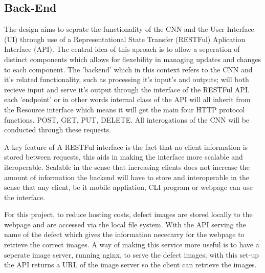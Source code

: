     \subsection{Back-End}
      The design aims to seprate the functionality of the CNN and the User Interface (UI) through use of a Representational State Transfer (RESTFul) Aplication Interface (API). The central idea of this aproach is to allow a seperation of distinct components which allows for flexebility in managing updates and changes to each component. The 'backend' which in this context refers to the CNN and it's related functionality, such as processing it's input's and outputs; will both recieve input and serve it's output through the interface of the RESTFul API. each 'endpoint' or in other words internal class of the API will all inherit from the Resource interface which means it will get the main four HTTP protocol functions. POST, GET, PUT, DELETE. All interogations of the CNN will be conducted through these requests.
      \par
      A key feature of A RESTFul interface is the fact that no client information is stored
      between requests, this aids in making the interface more scalable and iteroperable. Scalable in the sense that increasing clients does not increase the amount of information the backend will have to store and interoperable in the sense that any client, be it mobile appliation, CLI program or webpage can use the interface.
      \par
      For this project, to reduce hosting costs, defect images are stored locally to the webpage and are accessed via the local file system. With the API serving the name of the defect which gives the information nececarry for the webpage to retrieve the correct images. A way of making this service more useful is to have a seperate image server, running nginx, to serve the defect images; with this set-up the API returns a URL of the image server so the client can retrieve the images.

